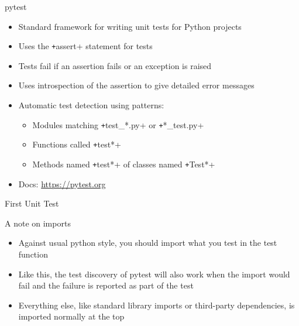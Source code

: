 \documentclass[
  aspectratio=1610,
]{beamer}
\begin{document}
\begin{frame}[c, fragile]{pytest}
  \begin{itemize}
    \item Standard framework for writing unit tests for Python projects
    \item Uses the \texttt+assert+ statement for tests
    \item Tests fail if an assertion fails or an exception is raised
    \item Uses introspection of the assertion to give detailed error messages
    \item Automatic test detection using patterns:
      \begin{itemize}
        \item Modules matching \texttt+test_*.py+ or \texttt+*_test.py+
        \item Functions called \texttt+test*+
        \item Methods named \texttt+test*+ of classes named \texttt+Test*+
      \end{itemize}

    \item Docs: \url{https://pytest.org}
  \end{itemize}

\end{frame}

\begin{frame}[c, fragile]{First Unit Test}

\end{frame}

\begin{frame}[c]{A note on imports}

  \begin{itemize}
    \item Against usual python style, you should import what you test in the test function
    \item Like this, the test discovery of pytest will also work when the import would fail and the failure is reported as part of the test
    \item Everything else, like standard library imports or third-party dependencies, is imported normally at the top
  \end{itemize}
\end{frame}
\end{document}

